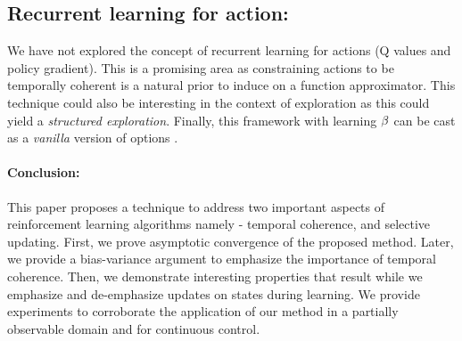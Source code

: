 \subsection{Recurrent learning for action:} We have not explored the concept of recurrent learning for actions (Q values and policy gradient). This is a promising area as constraining actions to be temporally coherent is a natural prior to induce on a function approximator. This technique could also be interesting in the context of exploration as this could yield a \emph{structured exploration}. Finally, this framework with learning $\beta$ can be cast as a \emph{vanilla} version of options \cite{sutton1999between}. 


\paragraph{Conclusion:}This paper proposes a technique to address two important aspects of reinforcement learning algorithms namely - temporal coherence, and selective updating. First, we prove asymptotic convergence of the proposed method. Later, we provide a bias-variance argument to emphasize the importance of temporal coherence. Then, we demonstrate interesting properties that result while we emphasize and de-emphasize updates on states during learning. We provide experiments to corroborate the application of our method in a partially observable domain and for continuous control.





 